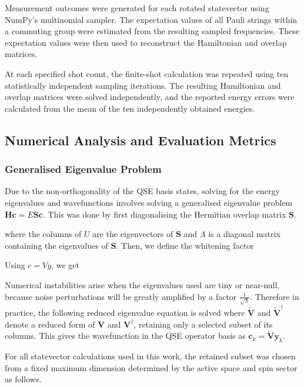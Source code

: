 Measurement outcomes were generated for each rotated statevector using NumPy's multinomial sampler. The expectation values of all Pauli strings within a commuting group were estimated from the resulting sampled frequencies. These expectation values were then used to reconstruct the Hamiltonian and overlap matrices.

At each specified shot count, the finite-shot calculation was repeated using ten statistically independent sampling iterations. The resulting Hamiltonian and overlap matrices were solved independently, and the reported energy errors were calculated from the mean of the ten independently obtained energies.

\subsection{Numerical Analysis and Evaluation Metrics}
\subsubsection{Generalised Eigenvalue Problem}
Due to the non-orthogonality of the QSE basis states, solving for the energy eigenvalues and wavefunctions involves solving a generalised eigenvalue problem $\mathbf{H}\mathbf{c} = E\mathbf{S}\mathbf{c}$. This was done by first diagonalising the Hermitian overlap matrix $\mathbf{S}$. 

\DiagonaliseSEquation
where the columns of $U$ are the eigenvectors of $\mathbf{S}$ and $\Lambda$ is a diagonal matrix containing the eigenvalues of $\mathbf{S}$. Then, we define the whitening factor

\WhitenSEquation

Using $c=Vy$, we get

\TransformToOrdinaryEigenvalueEquation

Numerical instabilities arise when the eigenvalues used are tiny or near-null, because noise perturbations will be greatly amplified by a factor $\frac{1}{\sqrt{\lambda}}$. 
Therefore in practice, the following reduced eigenvalue equation is solved
\ReducedEigenvalueEquation
where $\tilde{\mathbf{V}}$ and $\tilde{\mathbf{V}}^{\dagger}$ denote a reduced form of $\mathbf{V}$ and $\mathbf{V}^{\dagger}$, retaining only a selected subset of its columns. This gives the wavefunction in the QSE operator basis as $\mathbf{c}_k=\tilde{\mathbf{V}}\mathbf{y}_k$.

For all statevector calculations used in this work, the retained subset was chosen from a fixed maximum dimension determined by the active space and spin sector as follows. 

